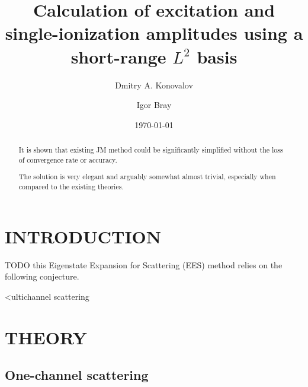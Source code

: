 \documentclass[aip
, pra
, showpacs
, aps
, twocolumn
, groupedaddress
, floatfix
]{revtex4}
\begin{document}
\title {Calculation of excitation and single-ionization amplitudes using a short-range $L^2$ basis}

\author{Dmitry A. Konovalov}

\author{Igor Bray}


\date{\today}

\begin{abstract}
It is shown that existing JM method could be significantly simplified without the loss of convergence rate or accuracy.


The solution is very elegant and arguably somewhat almost trivial, especially when compared to 
the existing theories.

\end{abstract}

\maketitle

\section{INTRODUCTION}
TODO
this Eigenstate Expansion for Scattering (EES) method relies on the following conjecture.

<ultichannel scattering \cite{CA73, NO72, TF79, Nesbet78, Lucchese86}

\section{THEORY}
\subsection{One-channel scattering}
\end{document}
